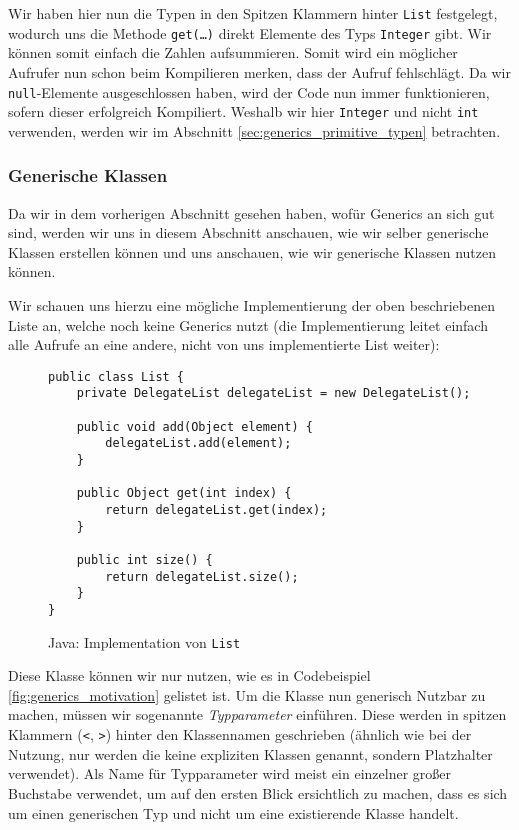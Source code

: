 		Wir haben hier nun die Typen in den Spitzen Klammern hinter \texttt{List} festgelegt, wodurch uns die Methode \texttt{get(\dots)} direkt Elemente des Typs \texttt{Integer} gibt. Wir können somit einfach die Zahlen aufsummieren. Somit wird ein möglicher Aufrufer nun schon beim Kompilieren merken, dass der Aufruf fehlschlägt. Da wir \texttt{null}-Elemente ausgeschlossen haben, wird der Code nun immer funktionieren, sofern dieser erfolgreich Kompiliert. Weshalb wir hier \texttt{Integer} und nicht \texttt{int} verwenden, werden wir im Abschnitt \ref{sec:generics_primitive_typen} betrachten.

	\subsubsection{Generische Klassen}
		Da wir in dem vorherigen Abschnitt gesehen haben, wofür Generics an sich gut sind, werden wir uns in diesem Abschnitt anschauen, wie wir selber generische Klassen erstellen können und uns anschauen, wie wir generische Klassen nutzen können.
		
		Wir schauen uns hierzu eine mögliche Implementierung der oben beschriebenen Liste an, welche noch keine Generics nutzt (die Implementierung leitet einfach alle Aufrufe an eine andere, nicht von uns implementierte List weiter):
		\begin{figure}[H]
			\centering
			\begin{lstlisting}[style = base]
public class List {
	private DelegateList delegateList = new DelegateList();

	public void add(Object element) {
		delegateList.add(element);
	}

	public Object get(int index) {
		return delegateList.get(index);
	}

	public int size() {
		return delegateList.size();
	}
}
			\end{lstlisting}
			\caption{Java: Implementation von \texttt{List}}
		\end{figure}
		
		Diese Klasse können wir nur nutzen, wie es in Codebeispiel \ref{fig:generics_motivation} gelistet ist. Um die Klasse nun generisch Nutzbar zu machen, müssen wir sogenannte \textit{Typparameter} einführen. Diese werden in spitzen Klammern (\texttt{<}, \texttt{>}) hinter den Klassennamen geschrieben (ähnlich wie bei der Nutzung, nur werden die keine expliziten Klassen genannt, sondern Platzhalter verwendet). Als Name für Typparameter wird meist ein einzelner großer Buchstabe verwendet, um auf den ersten Blick ersichtlich zu machen, dass es sich um einen generischen Typ und nicht um eine existierende Klasse handelt.
		
